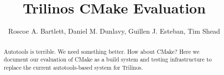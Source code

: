 \documentclass[pdf,ps2pdf,11pt]{SANDreport}
\title{
Trilinos CMake Evaluation
}
\author{Roscoe A. Bartlett, Daniel M. Dunlavy, Guillen J. Esteban, Tim Shead}
\date{}
\begin{document}
\raggedright

\maketitle

%

%
\begin{abstract}
%
Autotools is terrible. We need something better.  How about CMake?
Here we document our evaluation of CMake as a build system and testing
infrastructure to replace the current autotools-based system for
Trilinos.
%
\end{abstract}
%

%
%
%

%
\tableofcontents


\end{document}
